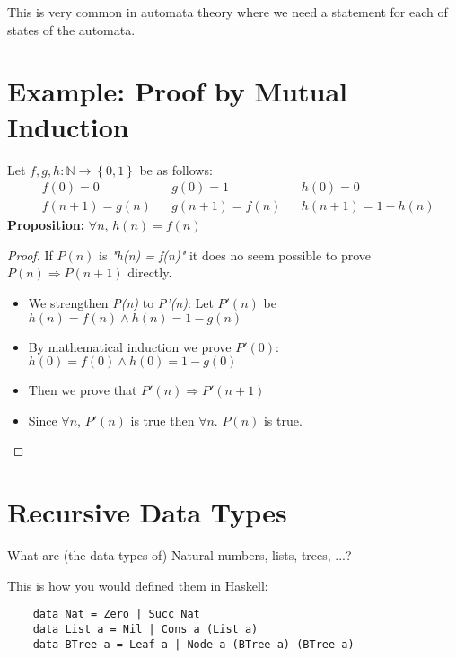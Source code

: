 This is very common in automata theory where we need a statement for each of states of the automata.

\section{Example: Proof by Mutual Induction} %
\label{sec:example_proof_by_mutual_induction}
Let $f,g,h: \mathbb{N} \to \left\{ 0,1 \right\}$ be as follows:
\begin{align*}
    &f(0) = 0 &&g(0) = 1 &&h(0)=0\\
    &f(n+1) = g(n) &&g(n+1) = f(n) && h(n+1) = 1 - h(n)
\end{align*}
\textbf{Proposition:} $\forall n$, $h(n) = f(n)$
\begin{proof}
    If $P(n)$ is \emph{"h(n) = f(n)"} it does no seem possible to prove $P(n) \Rightarrow P(n+1)$ directly.
    \begin{itemize}
        \item We strengthen \emph{P(n)} to \emph{P'(n)}: Let $P'(n)$ be $h(n) = f(n) \land h(n) = 1 - g(n)$
        \item By mathematical induction we prove $P'(0)$: $h(0) = f(0) \land h(0) = 1 - g(0)$
        \item Then we prove that $P'(n) \Rightarrow P'(n+1)$
        \item Since $\forall n$, $P'(n)$ is true then $\forall n$. $P(n)$ is true.
    \end{itemize}
\end{proof}

\section{Recursive Data Types} %
\label{sec:recursive_data_types}
What are (the data types of) Natural numbers, lists, trees, ...?\\
\smallskip

This is how you would defined them in Haskell:
\begin{lstlisting}
    data Nat = Zero | Succ Nat
    data List a = Nil | Cons a (List a)
    data BTree a = Leaf a | Node a (BTree a) (BTree a)
\end{lstlisting}

